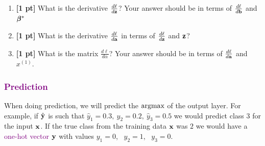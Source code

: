\begin{enumerate}
\begin{enumerate}
        
        \begin{tcolorbox}[fit,height=1cm, width=15cm, blank, borderline={1pt}{-2pt}]
        \end{tcolorbox}
        
        
        
        \item \textbf{[1 pt]} What is the derivative $\frac{d\ell}{d\mathbf{z}}$? Your answer should be in terms of $\frac{d\ell}{d\mathbf{b}}$ and $\boldsymbol \beta^*$
        
        
        \begin{tcolorbox}[fit,height=3cm, width=12cm, blank, borderline={1pt}{-2pt}]
        \end{tcolorbox}
        
        
        \item \textbf{[1 pt]} What is the derivative $\frac{d\ell}{d\mathbf{a}}$ in terms of $\frac{d\ell}{d\mathbf{z}}$ and $\mathbf{z}$?
        
        
        \begin{tcolorbox}[fit,height=3cm, width=12cm, blank, borderline={1pt}{-2pt}]
        \end{tcolorbox}
        
        
        \item \textbf{[1 pt]} What is the matrix $\frac{d\ell}{d\alpha}$? Your answer should be in terms of $\frac{d\ell}{d\mathbf{a}}$ and $x^{(1)}$.
        
        
        \begin{tcolorbox}[fit,height=3cm, width=12cm, blank, borderline={1pt}{-2pt}]
        \end{tcolorbox}

\end{enumerate}



\newpage
\subsubsection*{\textcolor{purple}{Prediction}}
When doing prediction, we will predict the \textcolor{purple}{$\mathop{\mathrm{argmax}}$} of the output layer. For example, if $\hat{\mathbf{y}}$ is such that $\hat{y}_1=0.3,~ \hat{y}_2=0.2,~ \hat{y}_3=0.5$ we would predict class 3 for the input $\mathbf{x}$. If the true class from the training data $\mathbf{x}$ was $2$ we would have a \textcolor{purple}{one-hot vector} $\mathbf{y}$ with values $y_1=0$,~ $y_2=1$,~ $y_3=0$.
    

\end{enumerate}
